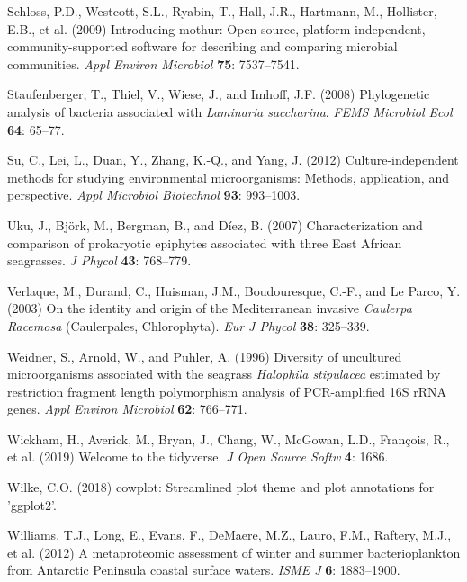 \documentclass[12pt,]{article}
\begin{document}
\leavevmode\hypertarget{ref-Schloss2009}{}%
Schloss, P.D., Westcott, S.L., Ryabin, T., Hall, J.R., Hartmann, M.,
Hollister, E.B., et al. (2009) Introducing mothur: Open-source,
platform-independent, community-supported software for describing and
comparing microbial communities. \emph{Appl Environ Microbiol}
\textbf{75}: 7537--7541.

\leavevmode\hypertarget{ref-Staufenberger2008}{}%
Staufenberger, T., Thiel, V., Wiese, J., and Imhoff, J.F. (2008)
Phylogenetic analysis of bacteria associated with \emph{Laminaria
saccharina}. \emph{FEMS Microbiol Ecol} \textbf{64}: 65--77.

\leavevmode\hypertarget{ref-Su2012}{}%
Su, C., Lei, L., Duan, Y., Zhang, K.-Q., and Yang, J. (2012)
Culture-independent methods for studying environmental microorganisms:
Methods, application, and perspective. \emph{Appl Microbiol Biotechnol}
\textbf{93}: 993--1003.

\leavevmode\hypertarget{ref-Uku2007}{}%
Uku, J., Björk, M., Bergman, B., and Díez, B. (2007) Characterization
and comparison of prokaryotic epiphytes associated with three East
African seagrasses. \emph{J Phycol} \textbf{43}: 768--779.

\leavevmode\hypertarget{ref-Verlaque2003}{}%
Verlaque, M., Durand, C., Huisman, J.M., Boudouresque, C.-F., and Le
Parco, Y. (2003) On the identity and origin of the Mediterranean
invasive \emph{Caulerpa} \emph{Racemosa} (Caulerpales, Chlorophyta).
\emph{Eur J Phycol} \textbf{38}: 325--339.

\leavevmode\hypertarget{ref-Weidner1996}{}%
Weidner, S., Arnold, W., and Puhler, A. (1996) Diversity of uncultured
microorganisms associated with the seagrass \emph{Halophila stipulacea}
estimated by restriction fragment length polymorphism analysis of
PCR-amplified 16S rRNA genes. \emph{Appl Environ Microbiol} \textbf{62}:
766--771.

\leavevmode\hypertarget{ref-Wickham2019}{}%
Wickham, H., Averick, M., Bryan, J., Chang, W., McGowan, L.D., François,
R., et al. (2019) Welcome to the tidyverse. \emph{J Open Source Softw}
\textbf{4}: 1686.

\leavevmode\hypertarget{ref-Wilke2018}{}%
Wilke, C.O. (2018) cowplot: Streamlined plot theme and plot annotations
for 'ggplot2'.

\leavevmode\hypertarget{ref-Williams2012}{}%
Williams, T.J., Long, E., Evans, F., DeMaere, M.Z., Lauro, F.M.,
Raftery, M.J., et al. (2012) A metaproteomic assessment of winter and
summer bacterioplankton from Antarctic Peninsula coastal surface waters.
\emph{ISME J} \textbf{6}: 1883--1900.
\end{document}
